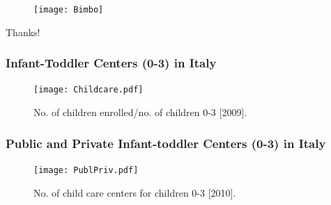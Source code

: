 \documentclass[xcolor=table]{beamer}
\begin{document}
\begin{frame}

\end{frame}
%
\begin{frame}

\end{frame}
\begin{frame}

\end{frame}

\appendix
\begin{frame}
\begin{center}
\begin{figure}
\texttt{[image: Bimbo]}
\end{figure}

\vspace{1ex}

{\Huge{Thanks!}}
\end{center}
\end{frame} 


\begin{frame}
\frametitle{Infant-Toddler Centers (0-3) in Italy}
\begin{center}
\begin{figure}
\texttt{[image: Childcare.pdf]} \label{fig:AttendaceAsiloIT}
\caption{No. of children enrolled/no. of children 0-3 [2009].}
\end{figure}
\end{center}
\hyperlink{frame:ECE_IT}{}
\end{frame} 
\begin{frame}
\frametitle{Public and Private Infant-toddler Centers (0-3) in Italy}
\begin{center}
\begin{figure}
\texttt{[image: PublPriv.pdf]}  \label{fig:PrivateAsiloIT}
\caption{No. of child care centers for children 0-3 [2010].}
\end{figure}
\end{center}
\hyperlink{frame:ECE_IT}{}
\end{frame} 
\end{document}
